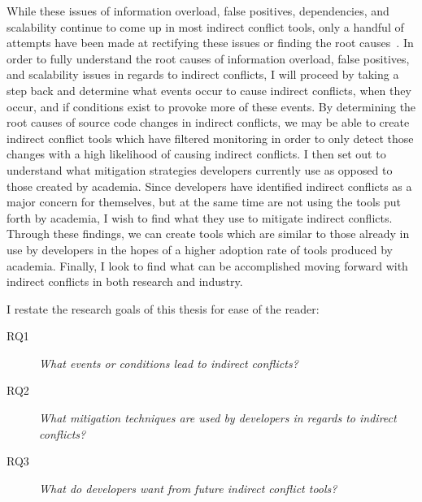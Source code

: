 While these issues of information overload, false positives, dependencies, and scalability continue to come up
in most indirect conflict tools, only a handful of attempts have been made at rectifying these issues or
finding the root causes~\cite{Holmes:2010:CAR,Kim:2011:ESA}. 
In order to fully understand the root causes of information overload, false positives, and
scalability issues in regards to indirect conflicts, I will proceed by taking a step back and determine what events occur to
cause indirect conflicts, when they occur, and if conditions exist to provoke more of these events. By determining the root
causes of source code changes in indirect conflicts, we may be able to create indirect conflict tools which have filtered
monitoring in order to only detect those changes with a high likelihood of causing indirect conflicts.
I then set out to understand what mitigation strategies developers currently use as opposed to those created
by academia. Since developers have identified indirect conflicts as a major concern for themselves, but at
the same time are not using the tools put forth by academia, I wish to find what they use to mitigate indirect
conflicts. Through these findings, we can create tools which are similar to those already in use by developers in
the hopes of a higher adoption rate of tools produced by academia.
Finally, I look to find what can be accomplished moving forward with indirect conflicts
in both research and industry.

I restate the research goals of this thesis for ease of the reader: 

\begin{description}
  \item[RQ1] \textit{What events or conditions lead to indirect conflicts?}
  \item[RQ2] \textit{What mitigation techniques are used by developers in regards to indirect conflicts?}
  \item[RQ3] \textit{What do developers want from future indirect conflict tools?}
\end{description}

\setlength{\unitlength}{\savedunitlength}
